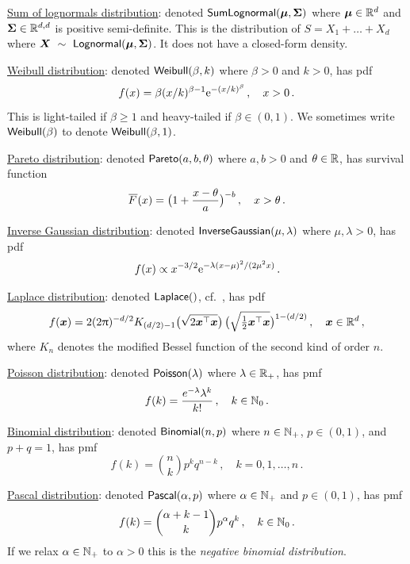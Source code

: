 \underline{Sum of lognormals distribution}: denoted $\mathsf{SumLognormal}(\bm{\mu}, \bm{\Sigma})$ where $\bm{\mu} \in \mathbb{R}^d$ and $\bm{\Sigma} \in \mathbb{R}^{d,d}$ is positive semi-definite. This is the distribution of $S = X_1 + \dots + X_d$ where $\bm{X}~\sim~\mathsf{Lognormal}(\bm{\mu}, \bm{\Sigma})$. It does not have a closed-form density.

\underline{Weibull distribution}: denoted $\mathsf{Weibull}(\beta, k)$ where $\beta > 0$ and $k > 0$, has pdf
\[ f(x) = \beta (x/k)^{\beta-1} \mathrm{e}^{-(x/k)^\beta} \,, \quad x > 0 \,. \]
This is light-tailed if $\beta \ge 1$ and heavy-tailed if $\beta \in (0, 1)$. We sometimes write $\mathsf{Weibull}(\beta)$ to denote $\mathsf{Weibull}(\beta, 1)$.

\underline{Pareto distribution}: denoted $\mathsf{Pareto}(a, b, \theta)$ where $a,b>0$ and $\theta \in \mathbb{R}$, has survival function
\[ \Ftail(x) = \bigl( 1 + \frac{x-\theta}{a} \bigr)^{-b} \,, \quad x > \theta \,. \]

\underline{Inverse Gaussian distribution}: denoted $\mathsf{InverseGaussian}(\mu,\lambda)$ where $\mu, \lambda > 0$, has pdf
\[ f(x) \propto x^{-3/2} \mathrm{e}^{-\lambda(x-\mu)^2/(2\mu^2x)}  \,. \]

\underline{Laplace distribution}: denoted $\mathsf{Laplace}()$, cf.\ \cite{eltoft2006multivariate,kotz2001asymmetric}, has pdf
\[
f(\bm{x}) = 2 (2 \uppi)^{-d/2}  K_{(d/2) -1} \bigl( \sqrt{2 \bm{x}^\top \bm{x}} \bigr) \,
 \bigl(\sqrt{\tfrac{1}{2} \bm{x}^\top \bm{x}}\bigr)^{1-(d/2)} \,, \quad \bm{x} \in \mathbb{R}^d \,,
\]
where $K_n$ denotes the modified Bessel function of the second kind of order $n$.

\underline{Poisson distribution}: denoted $\mathsf{Poisson}(\lambda)$ where $\lambda \in \mathbb{R}_+$, has pmf
\[ f(k) = \frac{e^{-\lambda}\lambda^{k}}{k!} \,, \quad k \in \mathbb{N}_0 \,. \]

\underline{Binomial distribution}: denoted $\mathsf{Binomial}(n,p)$ where $n \in \mathbb{N}_+$, $p \in (0,1)$, and $p+q=1$, has pmf
 \[ f(k) = \binom{n}{k} p^k q^{n-k} \,, \quad k = 0,1,\dots, n\,. \]

\underline{Pascal distribution}: denoted $\mathsf{Pascal}(\alpha,p)$ where $\alpha \in \mathbb{N}_+$ and $p \in (0,1)$, has pmf
\[ f(k) = \binom{\alpha+k-1}{k} p^\alpha q^k \,, \quad k \in \mathbb{N}_0 \,. \]
If we relax $\alpha \in \mathbb{N}_+$ to $\alpha > 0$ this is the \emph{negative binomial distribution}.

